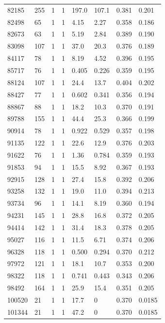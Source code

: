 \documentclass[preview]{standalone}
\begin{document}
{{{{{{{{{{{{{{{\begin{tabular}{L{1.2cm}C{1.2cm} C{0.3cm}C{0.5cm} C{1.4cm}C{1.4cm} C{1.4cm}C{1.4cm}}
  82185  &   255  & 1     &  1 &  197.0  & 107.1  & 0.381 &  0.201   \\ 
  82498  &    65  & 1     &  1 &  4.15  & 2.27  & 0.358 &  0.186   \\ 
  82673  &    63  & 1     &  1 &  5.19  & 2.84  & 0.389 &  0.190   \\ 
  83098  &   107  & 1     &  1 &  37.0  & 20.3  & 0.376 &  0.189   \\ 
  84117  &    78  & 1     &  1 &  8.19  & 4.52  & 0.396 &  0.195   \\ 
  85717  &    76  & 1     &  1 &  0.405  & 0.226  & 0.359 &  0.195   \\ 
  88124  &   107  & 1     &  1 &  24.4  & 13.7  & 0.404 &  0.202   \\ 
  88427  &    77  & 1     &  1 &  0.602  & 0.341  & 0.356 &  0.194   \\ 
  88867  &    88  & 1     &  1 &  18.2  & 10.3  & 0.370 &  0.191   \\ 
  89788  &   155  & 1     &  1 &  44.4  & 25.3  & 0.366 &  0.199   \\ 
  90914  &    78  & 1     &  1 &  0.922  & 0.529  & 0.357 &  0.198   \\ 
  91135  &   122  & 1     &  1 &  22.6  & 12.9  & 0.376 &  0.203   \\ 
  91622  &    76  & 1     &  1 &  1.36  & 0.784  & 0.359 &  0.193   \\ 
  91853  &    94  & 1     &  1 &  15.5  & 8.92  & 0.367 &  0.193   \\ 
  92915  &   128  & 1     &  1 &  27.4  & 15.8  & 0.392 &  0.206   \\ 
  93258  &   132  & 1     &  1 &  19.0  & 11.0  & 0.394 &  0.213   \\ 
  93734  &    96  & 1     &  1 &  14.1  & 8.19  & 0.360 &  0.194   \\ 
  94231  &   145  & 1     &  1 &  28.8  & 16.8  & 0.372 &  0.205   \\ 
  94414  &   142  & 1     &  1 &  31.4  & 18.3  & 0.378 &  0.205   \\ 
  95027  &   116  & 1     &  1 &  11.5  & 6.71  & 0.374 &  0.206   \\ 
  96328  &   118  & 1     &  1 &  0.500  & 0.294  & 0.370 &  0.212   \\ 
  97972  &   121  & 1     &  1 &  18.1  & 10.7  & 0.353 &  0.200   \\ 
  98322  &   118  & 1     &  1 &  0.741  & 0.443  & 0.343 &  0.206   \\ 
  98492  &   164  & 1     &  1 &  25.9  & 15.4  & 0.351 &  0.205   \\ 
  100520  &    21  & 1     &  1 &  17.7  & 0  & 0.370 &  0.0185   \\ 
  101344  &    21  & 1     &  1 &  47.2  & 0  & 0.370 &  0.0185   \\ 
\hline 
\end{tabular} 

}}}}}}}}}}}}}}}
\end{document}
